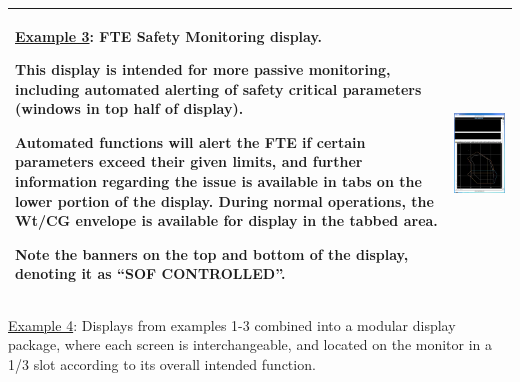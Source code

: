 \documentclass[
]{book}
\begin{document}
\begin{longtable}[]{@{}ll@{}}
\toprule
\endhead
\begin{minipage}[t]{0.46\columnwidth}\raggedright
\underline{Example 3}: FTE
Safety Monitoring display.

This display is intended for more
passive monitoring, including
automated alerting of safety critical
parameters (windows in top half of
display).

Automated functions will alert the FTE
if certain parameters exceed their
given limits, and further information
regarding the issue is available in
tabs on the lower portion of the
display. During normal operations, the
Wt/CG envelope is available for
display in the tabbed area.

Note the banners on the top and bottom
of the display, denoting it as ``SOF
CONTROLLED''.\strut
\end{minipage} & \begin{minipage}[t]{0.48\columnwidth}\raggedright
\includegraphics{media/21/fte-safety-monitoring.png}\strut
\end{minipage}\tabularnewline
\bottomrule
\end{longtable}

\underline{Example 4}: Displays from examples 1-3 combined into a modular display package, where each screen is interchangeable, and located on the monitor in a 1/3 slot according to its overall intended function.
\end{document}
